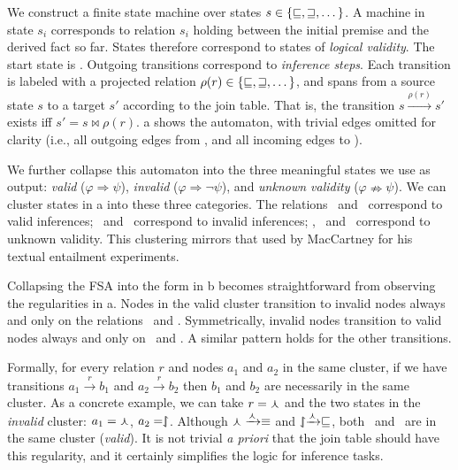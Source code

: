 We construct a
  finite state machine over states
  $s \in \{\textrm{\small{\ensuremath{\sqsubseteq}}}, \textrm{\small{\ensuremath{\sqsupseteq}}}, \dots \}$.
A machine in state $s_i$ corresponds to relation $s_i$
  holding between the initial premise and the derived fact so far.
States therefore correspond to states of \textit{logical validity}.
The start state is \equivalent.
Outgoing transitions correspond to \textit{inference steps}.
Each transition is labeled with a projected relation
  $\rho(r) \in \{\textrm{\small{\ensuremath{\sqsubseteq}}}, \textrm{\small{\ensuremath{\sqsupseteq}}}, \dots\}$,
  and spans from a source
  state $s$ to a target $s'$ according to the join table.
That is, the transition $s \xrightarrow{\rho(r)} s'$ exists iff
  $s' = s \bowtie \rho(r)$.
a shows the automaton, with trivial edges
  omitted for clarity (i.e., all outgoing edges from \equivalent, and
  all incoming edges to \independent).



We further collapse this automaton into the three
  meaningful states we use as output: 
    \textit{valid} ($\varphi \Rightarrow \psi$),
    \textit{invalid} ($\varphi \Rightarrow \lnot \psi$),
  and \textit{unknown validity} ($\varphi \nRightarrow \psi$).
We can cluster states in a into these three categories.
The relations \equivalent\ and \forward\ correspond to valid inferences;
  \negate\ and \alternate\ correspond to invalid inferences;
  \reverse, \cover\ and \independent\ correspond to unknown validity.
This clustering mirrors that used by MacCartney for his textual
  entailment experiments.

Collapsing the FSA into the form in b becomes straightforward
  from observing the regularities in a.
Nodes in the valid cluster transition to invalid nodes
  always and only on the relations \negate\ and \alternate.
Symmetrically, invalid nodes transition to valid nodes always and only
  on \negate\ and \cover.
A similar pattern holds for the other transitions.

Formally, for every relation $r$ and nodes $a_1$ and $a_2$ in
  the same cluster, if we have transitions 
  $a_1 \xrightarrow{r} b_1$ and $a_2 \xrightarrow{r} b_2$
  then $b_1$ and $b_2$ are necessarily in the same cluster.
As a concrete example, we can take $r = \curlywedge$ and
  the two states in the \textit{invalid} cluster:
  $a_1 = \curlywedge$, $a_2 = \downharpoonleft\hspace{-1.25mm}\upharpoonright$.
Although $\curlywedge \xrightarrow{\curlywedge} \equiv$ and
  $\downharpoonleft\hspace{-1.25mm}\upharpoonright \xrightarrow{\curlywedge} \sqsubseteq$, both
  \equivalent\ and \forward\ are in the same cluster (\textit{valid}).
It is not trivial \textit{a priori} that the join table should have
  this regularity, and it certainly simplifies the logic for
  inference tasks.

